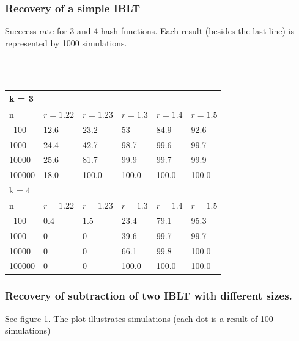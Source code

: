 \documentclass{article}
\begin{document}
\subsubsection{Recovery of a simple IBLT}
Succeess rate for 3 and 4 hash functions. Each result (besides the last line) is 
represented by 1000 simulations. 

\\ \\
\begin{center}
\begin{tabular}{l | l | l | l | l | l} \hline \hline k = 3 \\ \hline
    \hline n & $r = 1.22$ &  $r = 1.23$  &  $r = 1.3$ & $r = 1.4$ & $r = 1.5$\\ \hline
    \hline \ 100 & 12.6 & 23.2 & 53 & 84.9 & 92.6 \\ \hline 
    1000 & 24.4 & 42.7 & 98.7 & 99.6 & 99.7 \\ \hline
    10000 & 25.6 & 81.7 & 99.9 & 99.7 & 99.9 \\ \hline
    100000 & 18.0 & 100.0 & 100.0 & 100.0 & 100.0 \\ \hline
    \hline
    k = 4 \\
    \hline
    \hline n & $r = 1.22$ &  $r = 1.23$  &  $r = 1.3$ & $r = 1.4$ & $r = 1.5$\\ \hline
    \hline \ 100 & 0.4 & 1.5 & 23.4 & 79.1 & 95.3 \\ \hline 
    1000 & 0 & 0 & 39.6 & 99.7 & 99.7 \\ \hline
    10000 & 0 & 0 & 66.1 & 99.8 & 100.0 \\ \hline
    100000 & 0 & 0 & 100.0 & 100.0 & 100.0 \\ \hline
\end{tabular}
\end{center}


\subsubsection{Recovery of subtraction of two IBLT with different sizes.}

See figure 1. The plot illustrates simulations (each dot is a result of 100 
simulations)
\end{document}
